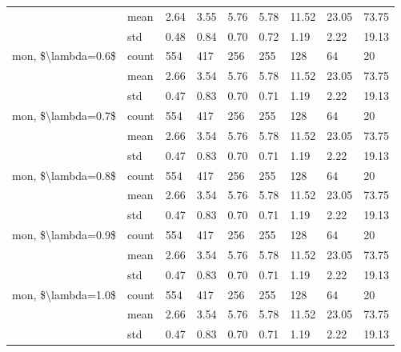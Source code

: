 \begin{tabular}{lllllllll}
                   & mean & 2.64 &  3.55 &  5.76 &  5.78 &  11.52 &  23.05 & 73.75 \\
                   & std & 0.48 &  0.84 &  0.70 &  0.72 &   1.19 &   2.22 & 19.13 \\
mon, \$\textbackslash lambda=0.6\$ & count &  554 &   417 &   256 &   255 &    128 &     64 &    20 \\
                   & mean & 2.66 &  3.54 &  5.76 &  5.78 &  11.52 &  23.05 & 73.75 \\
                   & std & 0.47 &  0.83 &  0.70 &  0.71 &   1.19 &   2.22 & 19.13 \\
mon, \$\textbackslash lambda=0.7\$ & count &  554 &   417 &   256 &   255 &    128 &     64 &    20 \\
                   & mean & 2.66 &  3.54 &  5.76 &  5.78 &  11.52 &  23.05 & 73.75 \\
                   & std & 0.47 &  0.83 &  0.70 &  0.71 &   1.19 &   2.22 & 19.13 \\
mon, \$\textbackslash lambda=0.8\$ & count &  554 &   417 &   256 &   255 &    128 &     64 &    20 \\
                   & mean & 2.66 &  3.54 &  5.76 &  5.78 &  11.52 &  23.05 & 73.75 \\
                   & std & 0.47 &  0.83 &  0.70 &  0.71 &   1.19 &   2.22 & 19.13 \\
mon, \$\textbackslash lambda=0.9\$ & count &  554 &   417 &   256 &   255 &    128 &     64 &    20 \\
                   & mean & 2.66 &  3.54 &  5.76 &  5.78 &  11.52 &  23.05 & 73.75 \\
                   & std & 0.47 &  0.83 &  0.70 &  0.71 &   1.19 &   2.22 & 19.13 \\
mon, \$\textbackslash lambda=1.0\$ & count &  554 &   417 &   256 &   255 &    128 &     64 &    20 \\
                   & mean & 2.66 &  3.54 &  5.76 &  5.78 &  11.52 &  23.05 & 73.75 \\
                   & std & 0.47 &  0.83 &  0.70 &  0.71 &   1.19 &   2.22 & 19.13 \\
\bottomrule
\end{tabular}
